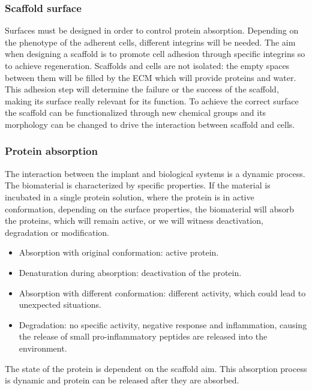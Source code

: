 		\subsubsection{Scaffold surface}
		Surfaces must be designed in order to control protein absorption.
		Depending on the phenotype of the adherent cells, different integrins will be needed.
		The aim when designing a scaffold is to promote cell adhesion through specific integrins so to achieve regeneration.
		Scaffolds and cells are not isolated: the empty spaces between them will be filled by the ECM which will provide proteins and water.
		This adhesion step will determine the failure or the success of the scaffold, making its surface really relevant for its function.
		To achieve the correct surface the scaffold can be functionalized through new chemical groups and its morphology can be changed to drive the interaction between scaffold and cells.

		\subsubsection{Protein absorption}
		The interaction between the implant and biological systems is a dynamic process.
		The biomaterial is characterized by specific properties.
		If the material is incubated in a single protein solution, where the protein is in active conformation, depending on the surface properties, the biomaterial will absorb the proteins, which will remain active, or we will witness deactivation, degradation or modification.

		\begin{multicols}{2}
			\begin{itemize}
				\item Absorption with original conformation: active protein.
				\item Denaturation during absorption: deactivation of the protein.
				\item Absorption with different conformation: different activity, which could lead to unexpected situations.
				\item Degradation: no specific activity, negative response and inflammation, causing the release of small pro-inflammatory peptides are released into the environment.
			\end{itemize}
		\end{multicols}

		The state of the protein is dependent on the scaffold aim.
		This absorption process is dynamic and protein can be released after they are absorbed.

